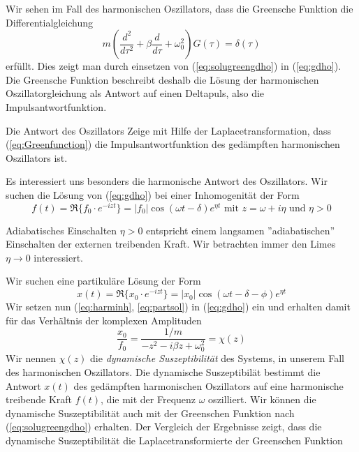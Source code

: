 Wir sehen im Fall des harmonischen Oszillators, dass die Greensche Funktion die
Differentialgleichung
\begin{equation}
  m\left(\frac{d^2}{d\tau^2}+\beta\frac{d}{d\tau}+\omega_0^2\right)G(\tau)=\delta(\tau)  
  \label{eq:dglGreensfunction}
\end{equation}
erfüllt. Dies zeigt man durch einsetzen von (\ref{eq:solugreengdho}) in (\ref{eq:gdho}).
Die Greensche Funktion beschreibt deshalb die Lösung der harmonischen
Oszillatorgleichung als Antwort auf einen Deltapuls, also die
Impulsantwortfunktion.
\begin{exercise}{Die Antwort des Oszillators}
Zeige mit Hilfe der Laplacetransformation, dass (\ref{eq:Greenfunction}) die
Impulsantwortfunktion des gedämpften harmonischen Oszillators ist.
\end{exercise}
Es interessiert uns besonders die harmonische Antwort des Oszillators.  Wir
suchen die Lösung von (\ref{eq:gdho}) bei einer Inhomogenität der Form
\begin{equation}\label{eq:harminh}
f(t)=\Re\{f_0\cdot e^{-izt}\}=|f_0| \cos(\omega t-\delta)e^{\eta t}\mbox{ mit }z=\omega
+i\eta\mbox{ und }\eta >0
\end{equation}
\begin{note}{Adiabatisches Einschalten}
$\eta >0$ entspricht einem langsamen ''adiabatischen'' Einschalten der externen
treibenden Kraft. Wir betrachten immer den Limes $\eta\rightarrow 0$
interessiert.
\end{note}
Wir suchen eine partikuläre Lösung der Form
\begin{equation}\label{eq:partsol}
x(t)=\Re\{x_0\cdot e^{-izt}\}=|x_0| \cos(\omega t-\delta-\phi)e^{\eta t}
\end{equation}
Wir setzen nun (\ref{eq:harminh}, \ref{eq:partsol}) in (\ref{eq:gdho}) ein und
erhalten damit für das Verhältnis der komplexen Amplituden
\begin{equation}\label{eq:dynsusz}
\frac{x_0}{f_0}=\frac{1/m}{-z^2-i\beta z+\omega_0^2}=\chi(z)
\end{equation}
Wir nennen $\chi(z)$ die {\it dynamische Suszeptibilität} des Systems, in unserem
Fall des harmonischen Oszillators. Die dynamische Suszeptibilät bestimmt die
Antwort $x(t)$ des gedämpften harmonischen Oszillators auf eine harmonische
treibende Kraft $f(t)$, die mit der Frequenz $\omega$ oszilliert. Wir können
die dynamische Suszeptibilität auch mit der Greenschen Funktion nach
(\ref{eq:solugreengdho}) erhalten. Der Vergleich der Ergebnisse zeigt, dass die
dynamische Suszeptibilität die Laplacetransformierte der Greenschen Funktion
